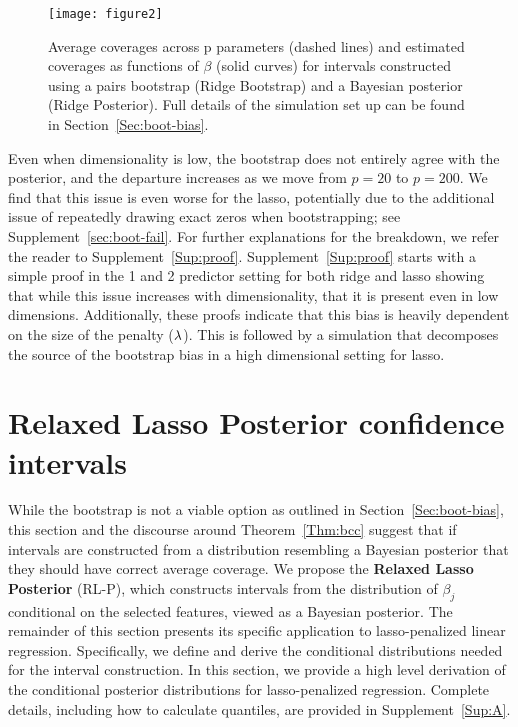 \begin{figure}[htb!]
  \begin{center}
    \texttt{[image: figure2]}
    \caption{\label{Fig:ridge_converge} Average coverages across p parameters (dashed lines) and estimated coverages as functions of $\beta$ (solid curves) for intervals constructed using a pairs bootstrap (Ridge Bootstrap) and a Bayesian posterior (Ridge Posterior). Full details of the simulation set up can be found in Section~\ref{Sec:boot-bias}.}
  \end{center}
\end{figure}

Even when dimensionality is low, the bootstrap does not entirely agree with the posterior, and the departure increases as we move from $p=20$ to $p=200$. We find that this issue is even worse for the lasso, potentially due to the additional issue of repeatedly drawing exact zeros when bootstrapping; see Supplement~\ref{sec:boot-fail}. For further explanations for the breakdown, we refer the reader to Supplement~\ref{Sup:proof}. Supplement~\ref{Sup:proof} starts with a simple proof in the 1 and 2 predictor setting for both ridge and lasso showing that while this issue increases with dimensionality, that it is present even in low dimensions. Additionally, these proofs indicate that this bias is heavily dependent on the size of the penalty ($\lambda$). This is followed by a simulation that decomposes the source of the bootstrap bias in a high dimensional setting for lasso.

\section{Relaxed Lasso Posterior confidence intervals}\label{Sec:methods}


While the bootstrap is not a viable option as outlined in Section~\ref{Sec:boot-bias}, this section and the discourse around Theorem~\ref{Thm:bcc} suggest that if intervals are constructed from a distribution resembling a Bayesian posterior that they should have correct average coverage. We propose the \textbf{Relaxed Lasso Posterior} (RL-P), which constructs intervals from the distribution of $\beta_j$ conditional on the selected features, viewed as a Bayesian posterior. The remainder of this section presents its specific application to lasso-penalized linear regression. Specifically, we define and derive the conditional distributions needed for the interval construction. In this section, we provide a high level derivation of the conditional posterior distributions for lasso-penalized regression. Complete details, including how to calculate quantiles, are provided in Supplement~\ref{Sup:A}.

